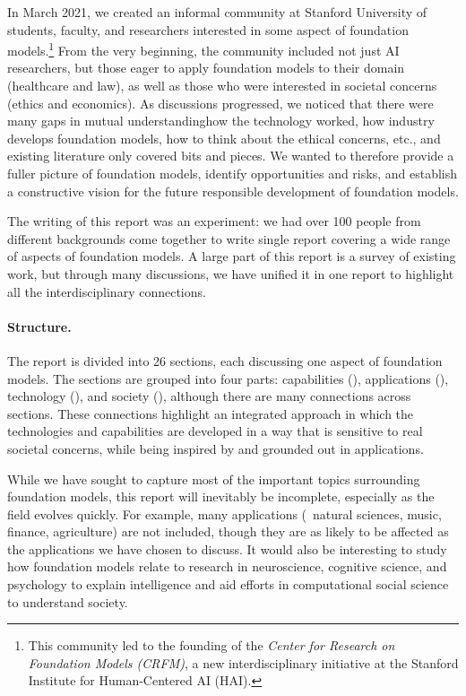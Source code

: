 In March 2021, we created an informal community at Stanford University of students, faculty, and researchers
interested in some aspect of foundation models.\footnote{This community
led to the founding of the \emph{Center for Research on Foundation Models (CRFM)},
a new interdisciplinary initiative at the Stanford Institute for Human-Centered AI (HAI).}
From the very beginning, the community included not just AI researchers,
but those eager to apply foundation models to their domain (\eg{}healthcare and law),
as well as those who were interested in societal concerns (\eg{}ethics and economics).
As discussions progressed,
we noticed that there were many gaps in mutual understanding\dash{}how the
technology worked, how industry develops foundation models, how to think about the ethical
concerns, etc.,
and existing literature only covered bits and pieces.
We wanted to therefore provide a fuller picture of foundation models, identify
opportunities and risks, and establish a constructive vision for the future responsible development of foundation models.

The writing of this report was an experiment:
we had over 100 people from different backgrounds come together to write
single report covering a wide range of aspects of foundation models.
A large part of this report is a survey of existing work, but through many discussions,
we have unified it in one report to highlight all the interdisciplinary connections.

\paragraph{Structure.}

The report is divided into 26 sections, each discussing one aspect of foundation models.
The sections are grouped into four parts:
capabilities (),
applications (),
technology (),
and society (),
although there are many connections across sections.
These connections highlight an integrated approach
in which the technologies and capabilities are developed in a way that is sensitive to
real societal concerns, while being inspired by and grounded out in applications.

While we have sought to capture most of the important topics surrounding
foundation models, this report will inevitably be incomplete,
especially as the field evolves quickly.
For example, many applications (\eg~natural sciences, music, finance, agriculture) are not included,
though they are as likely to be affected as the applications we have chosen to discuss.
It would also be interesting to study how foundation models relate to research in neuroscience, cognitive science, and psychology to explain intelligence and aid efforts in computational social science to understand society.

